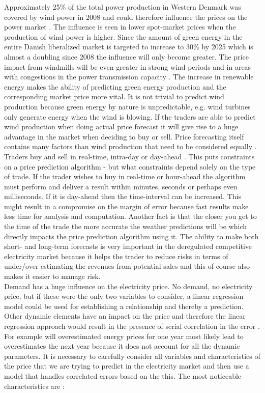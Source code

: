 \documentclass[twoside,11pt,openright]{report}
\begin{document}
Approximately 25\% of the total power production in Western Denmark was covered by wind power in 2008 and could therefore influence the prices on the power market \cite{windPowerDanishLiberalized}. The influence is seen in lower spot-market prices when the production of wind power is higher. Since the amount of green energy in the entire Danish liberalized market is targeted to increase to 30\% by 2025 which is almost a doubling since 2008 \cite{windPowerDanishLiberalized} the influence will only become greater. The price impact from windmills will be even greater in strong wind periods and in areas with congestions in the power transmission capacity \cite{windPowerDanishLiberalized}. The increase in renewable energy makes the ability of predicting green energy production and the corresponding market price more vital. It is not trivial to predict wind production because green energy by nature is unpredictable, e.g. wind turbines only generate energy when the wind is blowing. If the traders are able to predict wind production when doing actual price forecast it will give rise to a huge advantage in the market when deciding to buy or sell. Price forecasting itself contains many factors than wind production that need to be considered equally \cite{21}. 
\\[0.5cm] Traders buy and sell in real-time, intra-day or day-ahead
\cite{FIND REF}. This puts constraints on a price prediction algorithm - but what constraints depend solely on the type of trade. If the trader wishes to buy in real-time or hour-ahead the algorithm must perform and deliver a result within minutes, seconds or perhaps even milliseconds. If it is day-ahead then the time-interval can be increased. This might result in a compromise on the margin of error because fast results make less time for analysis and computation. Another fact is that the closer you get to the time of the trade the more accurate the weather predictions will be which directly impacts the price prediction algorithm using it. The ability to make both short- and long-term forecasts is very important in the deregulated competitive electricity market because it helps the trader to reduce risks in terms of under/over estimating the revenues from potential sales and this of course also makes it easier to manage risk\cite{21}.
\\[0.5cm]
Demand has a huge influence on the electricity price. No demand, no electricity price, but if these were the only two variables to consider, a linear regression model could be used for establishing a relationship and thereby a prediction. Other dynamic elements have an impact on the price and therefore the linear regression approach would result in the presence of serial correlation in the error \cite{21}. For example will overestimated energy prices for one year most likely lead to overestimates the next year because it does not account for all the dynamic parameters. It is necessary to carefully consider all variables and characteristics of the price that we are trying to predict in the electricity market and then use a model that handles correlated errors based on the this. The most noticeable characteristics are \cite{21}:
\end{document}
